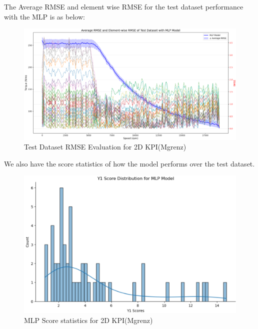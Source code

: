 \documentclass{report} %
\begin{document}
The Average RMSE and element wise RMSE for the test dataset performance with the \ac{MLP} is as below: \\

\begin{figure}[H]
    \centering
    \includegraphics[width=1\textwidth]{./ReportImages/avgrmse_y1.png} 
    \caption{Test Dataset RMSE Evaluation for 2D KPI(Mgrenz)} 
    \label{fig:Test Dataset RMSE Evaluation for 2D KPI(Mgrenz)}
\end{figure}

We also have the score statistics of how the model performs over the test dataset.\\

\begin{figure}[H]
    \centering
    \includegraphics[width=1\textwidth]{./ReportImages/score_mlp_y1.png} 
    \caption{MLP Score statistics for 2D KPI(Mgrenz)} 
    \label{fig:MLP Score statistics for 2D KPI(Mgrenz)}
\end{figure}
\end{document}
